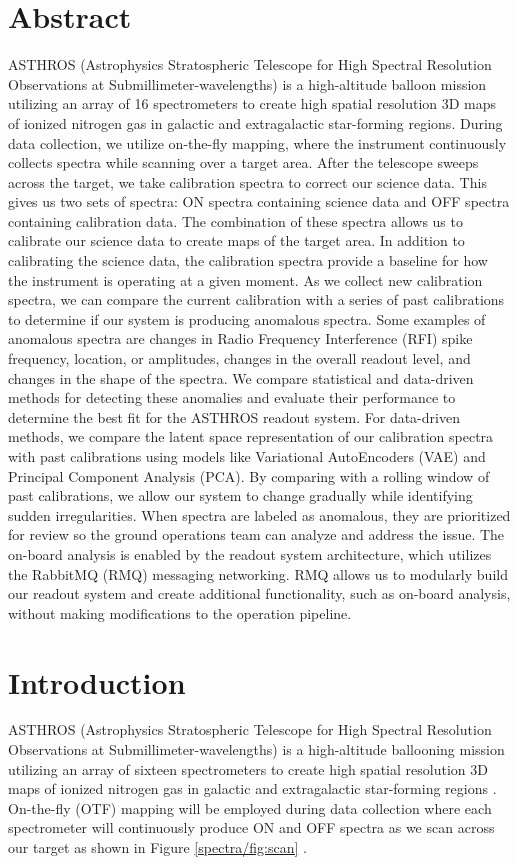 \section{Abstract}
ASTHROS (Astrophysics Stratospheric Telescope for High Spectral Resolution Observations at Submillimeter-wavelengths) is a high-altitude balloon mission utilizing an array of 16 spectrometers to create high spatial resolution 3D maps of ionized nitrogen gas in galactic and extragalactic star-forming regions.
During data collection, we utilize on-the-fly mapping, where the instrument continuously collects spectra while scanning over a target area.
After the telescope sweeps across the target, we take calibration spectra to correct our science data.
This gives us two sets of spectra: ON spectra containing science data and OFF spectra containing calibration data.
The combination of these spectra allows us to calibrate our science data to create maps of the target area.
In addition to calibrating the science data, the calibration spectra provide a baseline for how the instrument is operating at a given moment.
As we collect new calibration spectra, we can compare the current calibration with a series of past calibrations to determine if our system is producing anomalous spectra.
Some examples of anomalous spectra are changes in Radio Frequency Interference (RFI) spike frequency, location, or amplitudes, changes in the overall readout level, and changes in the shape of the spectra.
We compare statistical and data-driven methods for detecting these anomalies and evaluate their performance to determine the best fit for the ASTHROS readout system. For data-driven methods, we compare the latent space representation of our calibration spectra with past calibrations using models like Variational AutoEncoders (VAE) and Principal Component Analysis (PCA).
By comparing with a rolling window of past calibrations, we allow our system to change gradually while identifying sudden irregularities.
When spectra are labeled as anomalous, they are prioritized for review so the ground operations team can analyze and address the issue.
The on-board analysis is enabled by the readout system architecture, which utilizes the RabbitMQ (RMQ) messaging networking.
RMQ allows us to modularly build our readout system and create additional functionality, such as on-board analysis, without making modifications to the operation pipeline. 


\section{Introduction}
ASTHROS (Astrophysics Stratospheric Telescope for High Spectral Resolution Observations at Submillimeter-wavelengths) is a high-altitude ballooning mission utilizing an array of sixteen spectrometers to create high spatial resolution 3D maps of ionized nitrogen gas in galactic and extragalactic star-forming regions \parencite{siles2020asthros}. 
On-the-fly (OTF) mapping will be employed during data collection where each spectrometer will continuously produce ON and OFF spectra as we scan across our target as shown in Figure \ref{spectra/fig:scan} \parencite{mangum2007fly}. 

